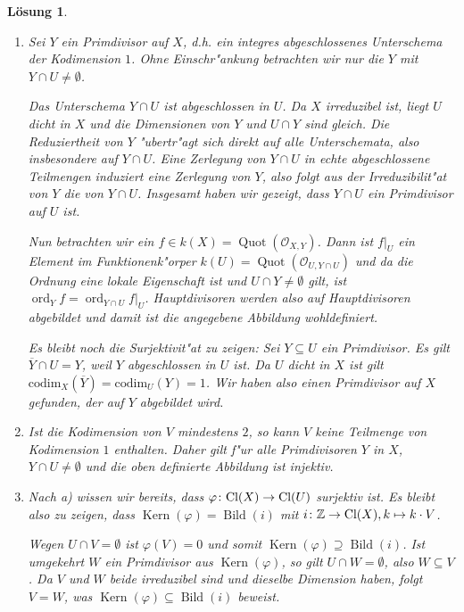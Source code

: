 \documentclass[paper = A4, fontsize=12pt, numbers=noendperiod, chapterprefix=true]{scrbook}
\theoremstyle{break}
\newtheorem{Loes}{L\"osung}
\theoremstyle{nonumberbreak}
\theoremstyle{nonumberplain}
\DeclareMathOperator{\Bild}{Bild}
\DeclareMathOperator{\Kern}{Kern}
\DeclareMathOperator{\Quot}{Quot}
\DeclareMathOperator{\ord}{ord}
\newcommand{\Z}{\mathbb{Z}}
\newcommand{\calO}{\mathcal{O}}
\begin{document}
\begin{Loes}
\begin{enumerate}%
 \item Sei $Y$ ein Primdivisor auf $X$, d.h. ein integres abgeschlossenes Unterschema der Kodimension $1$. Ohne Einschr"ankung betrachten wir nur die $Y$ mit $Y\cap U\neq \emptyset$. 

Das Unterschema $Y\cap U$ ist abgeschlossen in $U$. 
Da $X$ irreduzibel ist, liegt $U$ dicht in $X$ und die Dimensionen von $Y$ und $U \cap Y$ sind gleich. Die Reduziertheit von $Y$ "ubertr"agt sich direkt auf alle Unterschemata, also insbesondere auf $Y \cap U$. Eine Zerlegung von $Y \cap U$ in echte abgeschlossene Teilmengen induziert eine Zerlegung von $Y$, also folgt aus der Irreduzibilit"at von $Y$ die von $Y \cap U$. Insgesamt haben wir gezeigt, dass $Y \cap U$ ein Primdivisor auf $U$ ist. 

Nun betrachten wir ein $f \in k(X) = \Quot(\calO_{X,Y})$. Dann ist $f|_U$ ein Element im Funktionenk"orper $k(U) = \Quot(\calO_{U,Y\cap U})$ und da die Ordnung eine lokale Eigenschaft ist und $U \cap Y \neq \emptyset$ gilt, ist $\ord_Y f = \ord_{Y \cap U} f|_U$. Hauptdivisoren werden also auf Hauptdivisoren abgebildet und damit ist die angegebene Abbildung wohldefiniert.

Es bleibt noch die Surjektivit"at zu zeigen: Sei $Y \subseteq U$ ein Primdivisor. Es gilt $\overline{Y} \cap U = Y$, weil $Y$ abgeschlossen in $U$ ist. Da $U$ dicht in $X$ ist gilt $\textrm{codim}_X(\overline{Y}) = \textrm{codim}_U (Y) = 1$. Wir haben also einen Primdivisor auf $X$ gefunden, der auf $Y$ abgebildet wird.
\item Ist die Kodimension von $V$ mindestens $2$, so kann $V$ keine Teilmenge von Kodimension $1$ enthalten. Daher gilt f"ur alle Primdivisoren $Y$ in $X$, $Y \cap U \neq \emptyset$ und die oben definierte Abbildung ist injektiv.
\item Nach a) wissen wir bereits, dass $\varphi\colon \textup{Cl}(X) \rightarrow \textup{Cl}(U)$ surjektiv ist. Es bleibt also zu zeigen, dass $\Kern(\varphi) = \Bild(i)$ mit $i \colon \Z \rightarrow \textup{Cl}(X), k \mapsto k \cdot V$.

Wegen $U \cap V = \emptyset$ ist $\varphi(V) = 0$ und somit $\Kern(\varphi) \supseteq \Bild(i)$. Ist umgekehrt $W$ ein Primdivisor aus $\Kern(\varphi)$, so gilt $U \cap W  = \emptyset$, also $W \subseteq V$. Da $V$ und $W$ beide irreduzibel sind und dieselbe Dimension haben, folgt $V=W$, was $\Kern(\varphi) \subseteq \Bild(i)$ beweist.
\end{enumerate}
\end{Loes}
\end{document}
